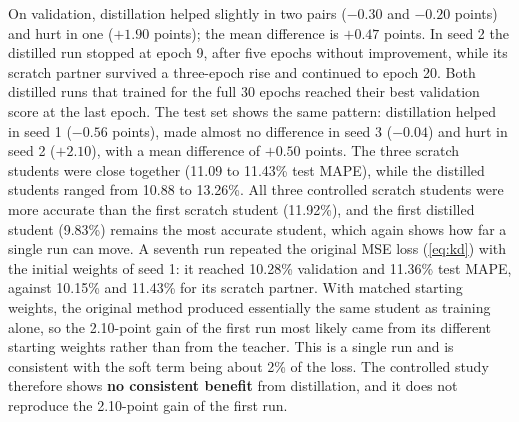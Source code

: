 On validation, distillation helped slightly in two pairs ($-0.30$ and $-0.20$ points) and hurt in one ($+1.90$ points); the mean difference is $+0.47$ points. In seed 2 the distilled run stopped at epoch 9, after five epochs without improvement, while its scratch partner survived a three-epoch rise and continued to epoch 20. Both distilled runs that trained for the full 30 epochs reached their best validation score at the last epoch. The test set shows the same pattern: distillation helped in seed 1 ($-0.56$ points), made almost no difference in seed 3 ($-0.04$) and hurt in seed 2 ($+2.10$), with a mean difference of $+0.50$ points. The three scratch students were close together (11.09 to 11.43\% test MAPE), while the distilled students ranged from 10.88 to 13.26\%. All three controlled scratch students were more accurate than the first scratch student (11.92\%), and the first distilled student (9.83\%) remains the most accurate student, which again shows how far a single run can move. A seventh run repeated the original MSE loss (\cref{eq:kd}) with the initial weights of seed 1: it reached 10.28\% validation and 11.36\% test MAPE, against 10.15\% and 11.43\% for its scratch partner. With matched starting weights, the original method produced essentially the same student as training alone, so the 2.10-point gain of the first run most likely came from its different starting weights rather than from the teacher. This is a single run and is consistent with the soft term being about 2\% of the loss. The controlled study therefore shows \textbf{no consistent benefit} from distillation, and it does not reproduce the 2.10-point gain of the first run.


